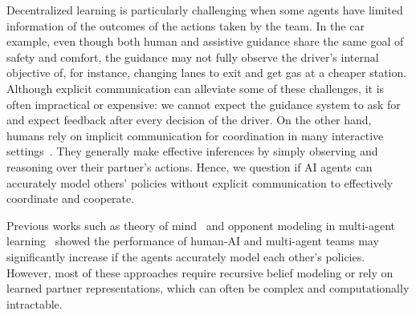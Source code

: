 \documentclass[letterpaper]{article} %
\theoremstyle{definition}
\begin{document}

Decentralized learning is particularly challenging when some agents have limited information of the outcomes of the actions taken by the team. 
In the car example, even though both human and assistive guidance share the same goal of safety and comfort, the guidance may not fully observe the driver's internal objective of, for instance, changing lanes to exit and get gas at a cheaper station.
Although explicit communication can alleviate some of these challenges, it is often impractical or expensive: we cannot expect the guidance system to ask for and expect feedback after every decision of the driver. On the other hand, humans rely on implicit communication for coordination in many interactive settings~\cite{breazeal2005effects,che2020efficient,losey2020learning}. They generally make effective inferences by simply observing and reasoning over their partner's actions. Hence, we question if AI agents can accurately model others' policies without explicit communication to effectively coordinate and cooperate.


Previous works such as theory of mind~\cite{simon1995information,baker2017rational,brooks2019building,lee2019theoryofmind} and opponent modeling in multi-agent learning~\cite{foerster2018learning,shih2021critical,xie2020learning}
showed the performance of human-AI and multi-agent teams may significantly increase if the agents accurately model each other's policies.
However, most of these approaches require recursive belief modeling or rely on learned partner representations, which can often be complex and computationally intractable.
\end{document}
